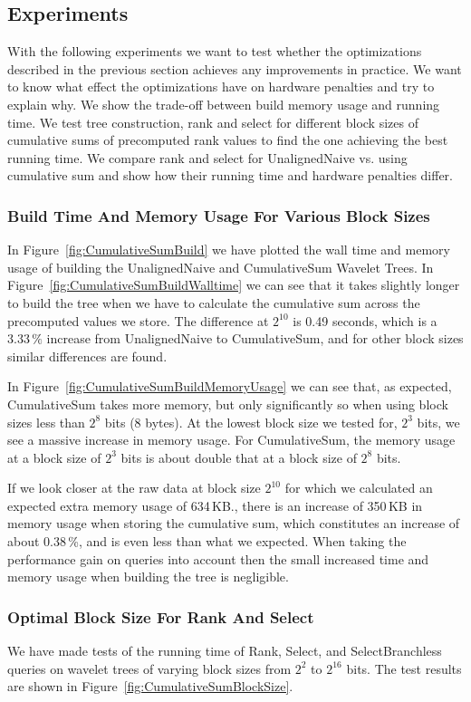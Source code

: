 \subsection{Experiments}
With the following experiments we want to test whether the optimizations described in the previous section achieves any improvements in practice.
We want to know what effect the optimizations have on hardware penalties and try to explain why.
We show the trade-off between build memory usage and running time.
We test tree construction, rank and select for different block sizes of cumulative sums of precomputed rank values to find the one achieving the best running time.
We compare rank and select for UnalignedNaive vs. using cumulative sum and show how their running time and hardware penalties differ.


\subsubsection{Build Time And Memory Usage For Various Block Sizes}
In Figure~\ref{fig:CumulativeSumBuild} we have plotted the wall time and memory usage of building the UnalignedNaive and CumulativeSum Wavelet Trees.
In Figure~\ref{fig:CumulativeSumBuildWalltime} we can see that it takes slightly longer to build the tree when we have to calculate the cumulative sum across the precomputed values we store.
The difference at $2^{10}$ is 0.49 seconds, which is a $3.33\,\%$ increase from UnalignedNaive to CumulativeSum, and for other block sizes similar differences are found.

In Figure~\ref{fig:CumulativeSumBuildMemoryUsage} we can see that, as expected, CumulativeSum takes more memory, but only significantly so when using block sizes less than $2^8$ bits (8 bytes).
At the lowest block size we tested for, $2^3$ bits, we see a massive increase in memory usage.
For CumulativeSum, the memory usage at a block size of $2^3$ bits is about double that at a block size of $2^8$ bits.

If we look closer at the raw data at block size $2^{10}$ for which we calculated an expected extra memory usage of 634\,KB., there is an increase of 350\,KB in memory usage when storing the cumulative sum, which constitutes an increase of about 0.38\,\%, and is even less than what we expected.
When taking the performance gain on queries into account then the small increased time and memory usage when building the tree is negligible.



\subsubsection{Optimal Block Size For Rank And Select}
\label{sec:OptimalBlockSizeForRankAndSelect}
We have made tests of the running time of Rank, Select, and SelectBranchless queries on wavelet trees of varying block sizes from $2^2$ to $2^{16}$ bits.
The test results are shown in Figure~\ref{fig:CumulativeSumBlockSize}.


